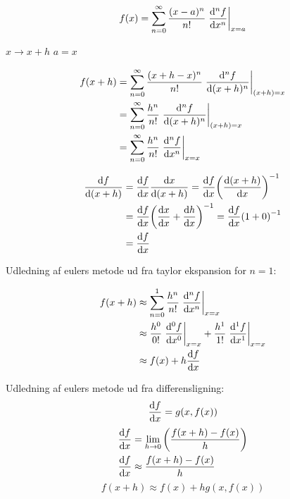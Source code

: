 \documentclass[11pt]{memoir}
\begin{document}
\begin{equation*}
    f(x) = \sum_{n=0}^\infty \frac{(x-a)^n}{n!}\eval{\dv[n]{f}{x}}_{x=a}
\end{equation*}

$x \rightarrow x+h$ $a=x$

\begin{align*}
    f(x+h) &= \sum_{n=0}^\infty \frac{(x + h - x)^n}{n!}\eval{\dv[n]{f}{(x+h)}}_{(x+h)=x}\\
    &= \sum_{n=0}^\infty \frac{h^n}{n!}\eval{\dv[n]{f}{(x+h)}}_{(x+h)=x}\\
    &= \sum_{n=0}^\infty \frac{h^n}{n!}\eval{\dv[n]{f}{x}}_{x=x}
\end{align*}

\begin{align*}
    \dv{f}{(x+h)} &= \dv{f}{x}\dv{x}{(x+h)} = \dv{f}{x}\qty(\dv{(x+h)}{x})^{-1}\\ &= \dv{f}{x}\qty(\dv{x}{x} + \dv{h}{x})^{-1} = \dv{f}{x}\qty(1 + 0)^{-1}\\
    &= \dv{f}{x}
\end{align*}

Udledning af eulers metode ud fra taylor ekspansion for $n=1$:

\begin{align*}
    f(x+h) &\approx \sum_{n=0}^1 \frac{h^n}{n!}\eval{\dv[n]{f}{x}}_{x=x}\\
    &\approx \frac{h^0}{0!}\eval{\dv[0]{f}{x}}_{x=x} + \frac{h^1}{1!}\eval{\dv[1]{f}{x}}_{x=x}\\
    &\approx f(x) + h\dv{f}{x}
\end{align*}

Udledning af eulers metode ud fra differensligning:
\begin{equation*}
    \dv{f}{x} = g(x,f(x))
\end{equation*}
\begin{align*}
    \dv{f}{x} &= \lim_{h \rightarrow 0}\qty(\frac{f(x+h) - f(x)}{h})\\
    \dv{f}{x} &\approx \frac{f(x+h) - f(x)}{h}
\end{align*}
\begin{equation*}
    f(x+h) \approx f(x) + hg(x,f(x))
\end{equation*}


\end{document}
